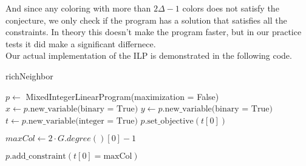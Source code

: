 \documentclass[12pt,a4paper]{amsart}
\theoremstyle{definition} %
\theoremstyle{plain} %
\begin{document}
        
        And since any coloring with more than $2\Delta - 1$ colors does not satisfy the conjecture, we only check if the program has a solution that satisfies all the constraints. In theory this doesn't make the program faster, but in our practice tests it did make a significant differnece.\\

        \pagebreak
        Our actual implementation of the ILP is demonstrated in the following code.


        \begin{algorithm}%
            \caption{richNeighbor}\label{algo:richNeighbor}
            \LinesNumberedHidden
            \DontPrintSemicolon



            $p \gets$ MixedIntegerLinearProgram(maximization = False)\;
            $x \gets p.\text{new\_variable(binary = True)}$\;
            $y \gets p.\text{new\_variable(binary = True)}$\;
            $t \gets p.\text{new\_variable(integer = True)}$\;
            $p.\text{set\_objective}(t[0])$\;

            $maxCol \gets 2 \cdot G.degree()[0] - 1$\;

            $p.\text{add\_constraint}(t[0] = \text{maxCol})$\;






\end{algorithm}
\end{document}
